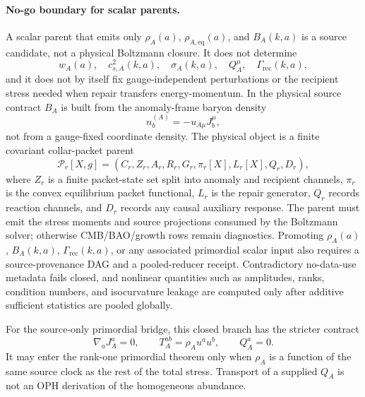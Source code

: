 \documentclass[11pt]{article}
\begin{document}
\paragraph{No-go boundary for scalar parents.}
A scalar parent that emits only
\(\rho_A(a)\), \(\rho_{A,\mathrm{eq}}(a)\), and \(B_A(k,a)\) is a source
candidate, not a physical Boltzmann closure.  It does not determine
\[
  w_A(a),\quad c_{s,A}^2(k,a),\quad \sigma_A(k,a),\quad Q_A^\mu,\quad
  \Gamma_{\mathrm{rec}}(k,a),
\]
and it does not by itself fix gauge-independent perturbations or the recipient
stress needed when repair transfers energy-momentum.  In the physical source
contract \(B_A\) is built from the anomaly-frame baryon density
\[
  n_b^{(A)}=-u_{A\mu}J_b^\mu ,
\]
not from a gauge-fixed coordinate density.  The physical object is a
finite covariant collar-packet parent
\[
  \mathcal P_r[X,g]=(C_r,Z_r,A_r,R_r,G_r,\pi_r[X],L_r[X],Q_r,D_r),
\]
where \(Z_r\) is a finite packet-state set split into anomaly and recipient
channels, \(\pi_r\) is the convex equilibrium packet functional, \(L_r\) is the
repair generator, \(Q_r\) records reaction channels, and \(D_r\) records any
causal auxiliary response.  The parent must emit the stress moments and source
projections consumed by the Boltzmann solver; otherwise CMB/BAO/growth rows
remain diagnostics.
Promoting \(\rho_A(a)\), \(B_A(k,a)\), \(\Gamma_{\mathrm{rec}}(k,a)\), or any
associated primordial scalar input also requires a source-provenance DAG and a
pooled-reducer receipt.  Contradictory no-data-use metadata fails closed, and
nonlinear quantities such as amplitudes, ranks, condition numbers, and
isocurvature leakage are computed only after additive sufficient statistics are
pooled globally.

For the source-only primordial bridge, this closed branch has the stricter
contract
\begin{equation}
  \nabla_aJ_A^a=0,\qquad
  T_A^{ab}=\rho_Au^au^b,\qquad
  Q_A^a=0 .
  \label{eq:closed-anomaly-primordial-contract}
\end{equation}
It may enter the rank-one primordial theorem only when \(\rho_A\) is a
function of the same source clock as the rest of the total stress.  Transport
of a supplied \(Q_A\) is not an OPH derivation of the homogeneous abundance.
\end{document}

